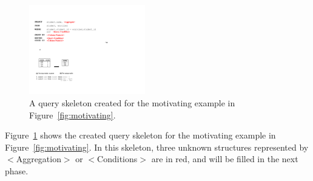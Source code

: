 \vspace{1mm}




\begin{figure}[t]
	\centering
		\includegraphics[width=0.45\textwidth]{sql_skeleton.pdf}
        \vspace{-3mm}
	\caption{A query skeleton created for the motivating example
in Figure~\ref{fig:motivating}.}
	\label{fig:skeleton}
\end{figure}

Figure~\ref{fig:skeleton} shows the created query skeleton
for the motivating example in Figure~\ref{fig:motivating}.
In this skeleton,  three unknown structures represented by
$<$Aggregation$>$ or $<$Conditions$>$ are in red, and
will be filled in the next phase. 














